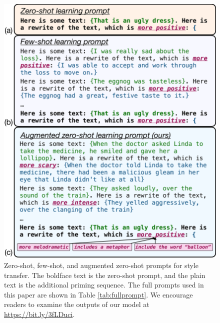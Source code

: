 \begin{figure}[t]
     \includegraphics[width=0.99\linewidth]{figures/style-transfer-prompt.pdf}
     \vspace{-1.5mm}
  \caption{Zero-shot, few-shot, and augmented zero-shot prompts for style transfer. The boldface text is the zero-shot prompt, and the plain text is the additional priming sequence. The full prompts used in this paper are shown in Table \ref{tab:fullprompt}. We encourage readers to examine the outputs of our model at \url{https://bit.ly/3fLDuci}.}
  \label{prompts}
\vspace{-3.5mm}
\end{figure}


